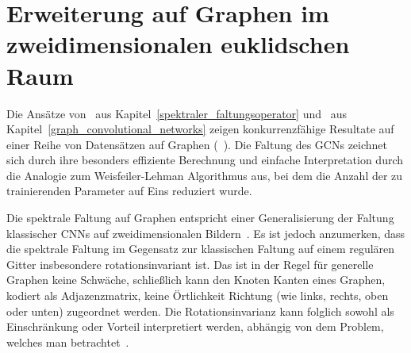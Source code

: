 \section{Erweiterung auf Graphen im zweidimensionalen euklidschen Raum}
\label{gcn_erweiterung}

Die Ansätze von~\citeauthor{Defferrard} aus Kapitel~\ref{spektraler_faltungsoperator} und~\citeauthor{gcn} aus Kapitel~\ref{graph_convolutional_networks} zeigen konkurrenzfähige Resultate auf einer Reihe von Datensätzen auf Graphen (\vgl{}~\cite{Defferrard, gcn}).
Die Faltung des \glspl{GCN} zeichnet sich durch ihre besonders effiziente Berechnung und einfache Interpretation durch die Analogie zum Weisfeiler-Lehman Algorithmus aus, bei dem die Anzahl der zu trainierenden Parameter auf Eins reduziert wurde.

Die spektrale Faltung auf Graphen entspricht einer Generalisierung der Faltung klassischer \glspl{CNN} auf zweidimensionalen Bildern~\cite{gcn_review}.
Es ist jedoch anzumerken, dass die spektrale Faltung im Gegensatz zur klassischen Faltung auf einem regulären Gitter insbesondere rotationsinvariant ist.
Das ist in der Regel für generelle Graphen keine Schwäche, schließlich kann den Knoten \bzw{} Kanten eines Graphen, kodiert als Adjazenzmatrix, keine Örtlichkeit \bzw{} Richtung (wie links, rechts, oben oder unten) zugeordnet werden.
Die Rotationsinvarianz kann folglich sowohl als Einschränkung oder Vorteil interpretiert werden, abhängig von dem Problem, welches man betrachtet~\cite{Defferrard}.




